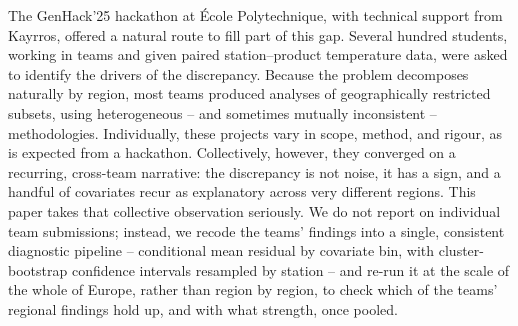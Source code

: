 \documentclass[a4paper,12pt,leqno]{article}
\begin{document}
The GenHack'25 hackathon at \'Ecole Polytechnique, with technical support
from Kayrros, offered a natural route to fill part of this gap.
Several hundred students, working in teams and given paired
station--product temperature data, were asked to identify the drivers of
the discrepancy. Because the problem decomposes naturally by region, most
teams produced analyses of geographically restricted subsets, using
heterogeneous -- and sometimes mutually inconsistent -- methodologies.
Individually, these projects vary in scope, method, and rigour, as is
expected from a hackathon. Collectively, however, they converged on a
recurring, cross-team narrative: the discrepancy is not noise, it has a
sign, and a handful of covariates recur as explanatory across very
different regions. This paper takes that collective observation
seriously. We do not report on individual team submissions; instead, we
recode the teams' findings into a single, consistent diagnostic pipeline
-- conditional mean residual by covariate bin, with
cluster-bootstrap confidence intervals resampled by station -- and re-run
it at the scale of the whole of Europe, rather than region by region, to
check which of the teams' regional findings hold up, and with what
strength, once pooled.
\end{document}
